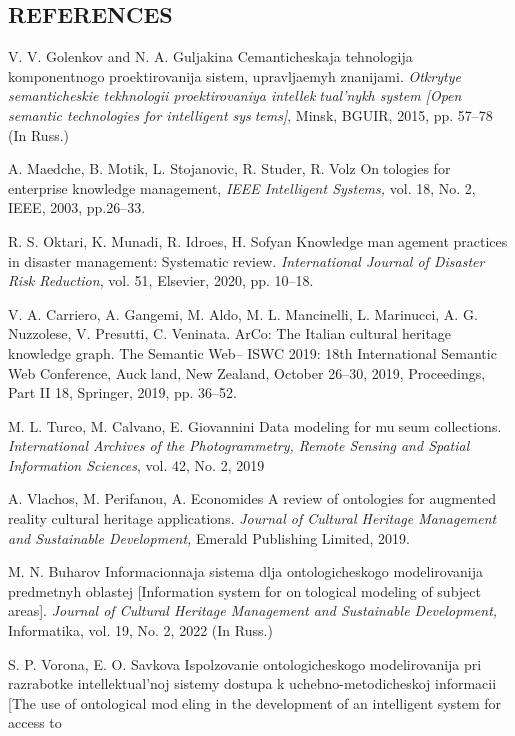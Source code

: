 \documentclass{article}
\begin{document}
\begin{multicols}{2}
\begin{center}
\chapter{REFERENCES}
\end{center}
{\footnotesize
\begin{enumerate}[label={[}\footnotesize\arabic*{]}, noitemsep]
\item V. V. Golenkov and N. A. Guljakina Cemanticheskaja tehnologija
komponentnogo proektirovanija sistem, upravljaemyh znanijami.
\textit{Otkrytye semanticheskie tekhnologii proektirovaniya intellektual’nykh system [Open semantic technologies for intelligent systems]}, Minsk, BGUIR, 2015, pp. 57–78 (In Russ.)
\item A. Maedche, B. Motik, L. Stojanovic, R. Studer, R. Volz Ontologies for enterprise knowledge management,\textit{ IEEE Intelligent
Systems,} vol. 18, No. 2, IEEE, 2003, pp.26–33.
\item R. S. Oktari, K. Munadi, R. Idroes, H. Sofyan Knowledge management practices in disaster management: Systematic review.
\textit{International Journal of Disaster Risk Reduction}, vol. 51, Elsevier,
2020, pp. 10–18.
\item V. A. Carriero, A. Gangemi, M. Aldo, M. L. Mancinelli, L.
Marinucci, A. G. Nuzzolese, V. Presutti, C. Veninata. ArCo: The
Italian cultural heritage knowledge graph. The Semantic Web–
ISWC 2019: 18th International Semantic Web Conference, Auckland, New Zealand, October 26–30, 2019, Proceedings, Part II 18,
Springer, 2019, pp. 36–52.
\item M. L. Turco, M. Calvano, E. Giovannini Data modeling for museum collections. \textit{International Archives of the Photogrammetry,
Remote Sensing and Spatial Information Sciences}, vol. 42, No. 2,
2019
\item A. Vlachos, M. Perifanou, A. Economides A review of ontologies
for augmented reality cultural heritage applications.\textit{ Journal of
Cultural Heritage Management and Sustainable Development,}
Emerald Publishing Limited, 2019.
\item M. N. Buharov Informacionnaja sistema dlja ontologicheskogo
modelirovanija predmetnyh oblastej [Information system for ontological modeling of subject areas]. \textit{Journal of Cultural Heritage
Management and Sustainable Development,} Informatika, vol. 19,
No. 2, 2022 (In Russ.)
\item S. P. Vorona, E. O. Savkova Ispolzovanie ontologicheskogo
modelirovanija pri razrabotke intellektual’noj sistemy dostupa k
uchebno-metodicheskoj informacii [The use of ontological modeling in the development of an intelligent system for access to

\end{enumerate}}
\end{multicols}
\end{document}
